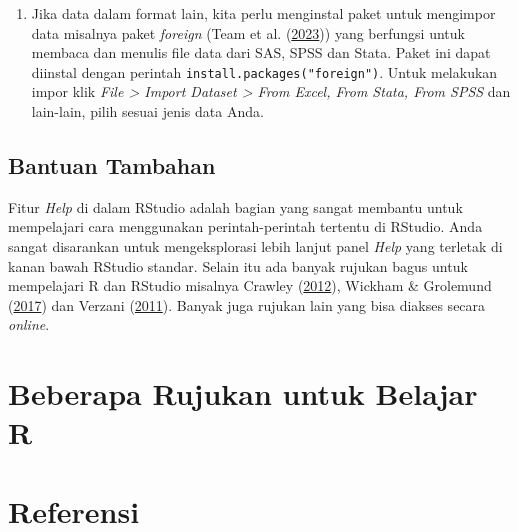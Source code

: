 \documentclass[a4paper, nobind]{templates/ociamthesis}
\providecommand{\tightlist}{%
  \setlength{\itemsep}{0pt}\setlength{\parskip}{0pt}}
\begin{document}
\begin{enumerate}
\def\labelenumi{\arabic{enumi}.}
\setcounter{enumi}{1}
\tightlist
\item
  Jika data dalam format lain, kita perlu menginstal paket untuk mengimpor data misalnya paket \emph{foreign} (Team et al. (\protect\hyperlink{ref-rcoreteamForeignReadData2023}{2023})) yang berfungsi untuk membaca dan menulis file data dari SAS, SPSS dan Stata. Paket ini dapat diinstal dengan perintah \texttt{install.packages("foreign")}. Untuk melakukan impor klik \emph{File \textgreater{} Import Dataset \textgreater{} From Excel, From Stata, From SPSS} dan lain-lain, pilih sesuai jenis data Anda.
\end{enumerate}

\hypertarget{bantuan-tambahan}{%
\section{Bantuan Tambahan}\label{bantuan-tambahan}}

Fitur \emph{Help} di dalam RStudio adalah bagian yang sangat membantu untuk mempelajari cara menggunakan perintah-perintah tertentu di RStudio. Anda sangat disarankan untuk mengeksplorasi lebih lanjut panel \emph{Help} yang terletak di kanan bawah RStudio standar. Selain itu ada banyak rujukan bagus untuk mempelajari R dan RStudio misalnya Crawley (\protect\hyperlink{ref-crawleyBook2012}{2012}), Wickham \& Grolemund (\protect\hyperlink{ref-wickhamDataScience2017}{2017}) dan Verzani (\protect\hyperlink{ref-verzaniGettingStartedRStudio2011}{2011}). Banyak juga rujukan lain yang bisa diakses secara \emph{online}.

\startappendices

\hypertarget{beberapa-rujukan-untuk-belajar-r}{%
\chapter{Beberapa Rujukan untuk Belajar R}\label{beberapa-rujukan-untuk-belajar-r}}

\hypertarget{referensi}{%
\chapter*{Referensi}\label{referensi}}

\end{document}
